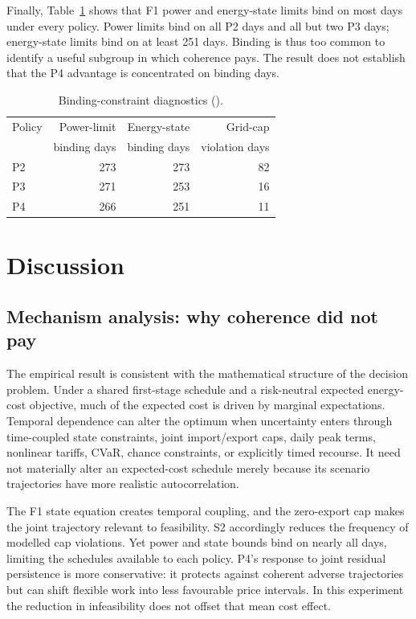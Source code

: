 \documentclass[10pt,twocolumn]{article}
\newcommand{\status}[1]{\texttt{\detokenize{#1}}}
\begin{document}
Finally, Table~\ref{tab:binding} shows that F1 power and energy-state limits
bind on most days under every policy. Power limits bind on all P2 days and all
but two P3 days; energy-state limits bind on at least 251 days. Binding is thus
too common to identify a useful subgroup in which coherence pays. The result
does not establish that the P4 advantage is concentrated on binding days.

\begin{table}[t]
\centering
\caption{Binding-constraint diagnostics
(\status{EXPLORATORY_DIAGNOSTIC}).}
\label{tab:binding}
\small
\begin{tabular}{lrrr}
\toprule
Policy & Power-limit & Energy-state & Grid-cap\\
 & binding days & binding days & violation days\\
\midrule
P2 & 273 & 273 & 82\\
P3 & 271 & 253 & 16\\
P4 & 266 & 251 & 11\\
\bottomrule
\end{tabular}
\end{table}

\section{Discussion}
\label{sec:discussion}

\subsection{Mechanism analysis: why coherence did not pay}
\label{sec:mechanism}

The empirical result is consistent with the mathematical structure of the
decision problem. Under a shared first-stage schedule and a risk-neutral
expected energy-cost objective, much of the expected cost is driven by marginal
expectations. Temporal dependence can alter the optimum when uncertainty enters
through time-coupled state constraints, joint import/export caps, daily peak
terms, nonlinear tariffs, CVaR, chance constraints, or explicitly timed
recourse. It need not materially alter an expected-cost schedule merely because
its scenario trajectories have more realistic autocorrelation.

The F1 state equation creates temporal coupling, and the zero-export cap makes
the joint trajectory relevant to feasibility. S2 accordingly reduces the
frequency of modelled cap violations. Yet power and state bounds bind on nearly
all days, limiting the schedules available to each policy. P4's response to
joint residual persistence is more conservative: it protects against coherent
adverse trajectories but can shift flexible work into less favourable price
intervals. In this experiment the reduction in infeasibility does not offset
that mean cost effect.
\end{document}
